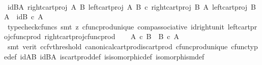 \begin{isabellebody}
\ \ \isamarkupfalse%
\ id{\isacharunderscore}{\kern0pt}BA{\isacharcolon}{\kern0pt}\ {\isachardoublequoteopen}{\isasymlangle}right{\isacharunderscore}{\kern0pt}cart{\isacharunderscore}{\kern0pt}proj\ A\ B{\isacharcomma}{\kern0pt}\ left{\isacharunderscore}{\kern0pt}cart{\isacharunderscore}{\kern0pt}proj\ A\ B{\isasymrangle}\ {\isasymcirc}\isactrlsub c\ {\isasymlangle}right{\isacharunderscore}{\kern0pt}cart{\isacharunderscore}{\kern0pt}proj\ B\ A{\isacharcomma}{\kern0pt}\ left{\isacharunderscore}{\kern0pt}cart{\isacharunderscore}{\kern0pt}proj\ B\ A{\isasymrangle}\ {\isacharequal}{\kern0pt}\ id{\isacharparenleft}{\kern0pt}B\ {\isasymtimes}\isactrlsub c\ A{\isacharparenright}{\kern0pt}{\isachardoublequoteclose}\isanewline
\ \ \ \ \isamarkupfalse%
\ {\isacharparenleft}{\kern0pt}typecheck{\isacharunderscore}{\kern0pt}cfuncs{\isacharcomma}{\kern0pt}\ smt\ {\isacharparenleft}{\kern0pt}z{}{\isacharparenright}{\kern0pt}\ cfunc{\isacharunderscore}{\kern0pt}prod{\isacharunderscore}{\kern0pt}unique\ comp{\isacharunderscore}{\kern0pt}associative{}\ id{\isacharunderscore}{\kern0pt}right{\isacharunderscore}{\kern0pt}unit{}\ left{\isacharunderscore}{\kern0pt}cart{\isacharunderscore}{\kern0pt}proj{\isacharunderscore}{\kern0pt}cfunc{\isacharunderscore}{\kern0pt}prod\ right{\isacharunderscore}{\kern0pt}cart{\isacharunderscore}{\kern0pt}proj{\isacharunderscore}{\kern0pt}cfunc{\isacharunderscore}{\kern0pt}prod{\isacharparenright}{\kern0pt}\isanewline
\ \ \isamarkupfalse%
\ {\isachardoublequoteopen}A\ {\isasymtimes}\isactrlsub c\ B\ {\isasymcong}\ B\ {\isasymtimes}\isactrlsub c\ A{\isachardoublequoteclose}\isanewline
\ \ \ \ \isamarkupfalse%
\ {\isacharparenleft}{\kern0pt}smt\ {\isacharparenleft}{\kern0pt}verit{\isacharcomma}{\kern0pt}\ ccfv{\isacharunderscore}{\kern0pt}threshold{\isacharparenright}{\kern0pt}\ canonical{\isacharunderscore}{\kern0pt}cart{\isacharunderscore}{\kern0pt}prod{\isacharunderscore}{\kern0pt}is{\isacharunderscore}{\kern0pt}cart{\isacharunderscore}{\kern0pt}prod\ cfunc{\isacharunderscore}{\kern0pt}prod{\isacharunderscore}{\kern0pt}unique\ cfunc{\isacharunderscore}{\kern0pt}type{\isacharunderscore}{\kern0pt}def\ id{\isacharunderscore}{\kern0pt}AB\ id{\isacharunderscore}{\kern0pt}BA\ is{\isacharunderscore}{\kern0pt}cart{\isacharunderscore}{\kern0pt}prod{\isacharunderscore}{\kern0pt}def\ is{\isacharunderscore}{\kern0pt}isomorphic{\isacharunderscore}{\kern0pt}def\ isomorphism{\isacharunderscore}{\kern0pt}def{\isacharparenright}{\kern0pt}\isanewline
{}\isamarkupfalse%

\end{isabellebody}
